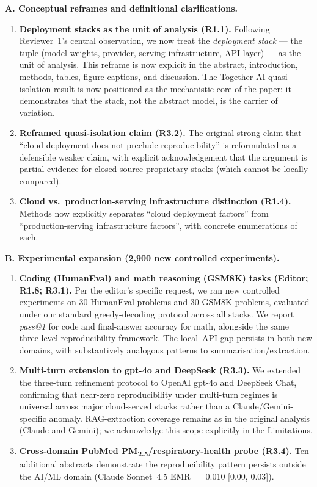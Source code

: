 \documentclass[11pt,a4paper]{article}
\begin{document}
\medskip
\noindent\textbf{A. Conceptual reframes and definitional clarifications.}
\begin{enumerate}[leftmargin=*]
  \item \textbf{Deployment stacks as the unit of analysis (R1.1).} Following Reviewer~1's central observation, we now treat the \emph{deployment stack} --- the tuple (model weights, provider, serving infrastructure, API layer) --- as the unit of analysis. This reframe is now explicit in the abstract, introduction, methods, tables, figure captions, and discussion. The Together AI quasi-isolation result is now positioned as the mechanistic core of the paper: it demonstrates that the stack, not the abstract model, is the carrier of variation.

  \item \textbf{Reframed quasi-isolation claim (R3.2).} The original strong claim that ``cloud deployment does not preclude reproducibility'' is reformulated as a defensible weaker claim, with explicit acknowledgement that the argument is partial evidence for closed-source proprietary stacks (which cannot be locally compared).

  \item \textbf{Cloud vs.\ production-serving infrastructure distinction (R1.4).} Methods now explicitly separates ``cloud deployment factors'' from ``production-serving infrastructure factors'', with concrete enumerations of each.
\end{enumerate}

\medskip
\noindent\textbf{B. Experimental expansion (2{,}900 new controlled experiments).}
\begin{enumerate}[leftmargin=*,resume]
  \item \textbf{Coding (HumanEval) and math reasoning (GSM8K) tasks (Editor; R1.8; R3.1).} Per the editor's specific request, we ran new controlled experiments on 30 HumanEval problems and 30 GSM8K problems, evaluated under our standard greedy-decoding protocol across all stacks. We report \emph{pass@1} for code and final-answer accuracy for math, alongside the same three-level reproducibility framework. The local--API gap persists in both new domains, with substantively analogous patterns to summarisation/extraction.

  \item \textbf{Multi-turn extension to gpt-4o and DeepSeek (R3.3).} We extended the three-turn refinement protocol to OpenAI gpt-4o and DeepSeek Chat, confirming that near-zero reproducibility under multi-turn regimes is universal across major cloud-served stacks rather than a Claude/Gemini-specific anomaly. RAG-extraction coverage remains as in the original analysis (Claude and Gemini); we acknowledge this scope explicitly in the Limitations.

  \item \textbf{Cross-domain PubMed PM\textsubscript{2.5}/respiratory-health probe (R3.4).} Ten additional abstracts demonstrate the reproducibility pattern persists outside the AI/ML domain (Claude Sonnet~4.5 EMR~=~0.010 [0.00, 0.03]).
\end{enumerate}
\end{document}
